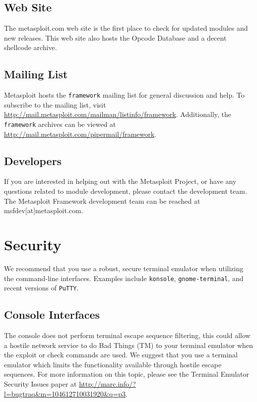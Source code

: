 \documentclass{report}
\begin{document}
\section{Web Site}

\par
The metasploit.com web site is the first place to check for updated modules and
new releases. This web site also hosts the Opcode Database and a decent
shellcode archive.

\section{Mailing List}

\par
Metasploit hosts the \texttt{framework} mailing list for general discussion and
help. To subscribe to the mailing list, visit
\url{http://mail.metasploit.com/mailman/listinfo/framework}. Additionally, the
\texttt{framework} archives can be viewed at
\url{http://mail.metasploit.com/pipermail/framework}.

\section{Developers}

\par
If you are interested in helping out with the Metasploit Project, or have any
questions related to module development, please contact the development team.
The Metasploit Framework development team can be reached at
msfdev[at]metasploit.com.

\pagebreak

\appendix

\pagebreak

\chapter{Security}

\par
We recommend that you use a robust, secure terminal emulator when utilizing the
command-line interfaces. Examples include \texttt{konsole},
\texttt{gnome-terminal}, and recent versions of \texttt{PuTTY}.

	\section{Console Interfaces}

\par
The console does not perform terminal escape sequence filtering, this could
allow a hostile network service to do Bad Things (TM) to your terminal emulator
when the exploit or check commands are used. We suggest that you use a terminal
emulator which limits the functionality available through hostile escape
sequences. For more information on this topic, please see the Terminal Emulator
Security Issues paper at
\url{http://marc.info/?l=bugtraq&m=104612710031920&q=p3}.
\end{document}
